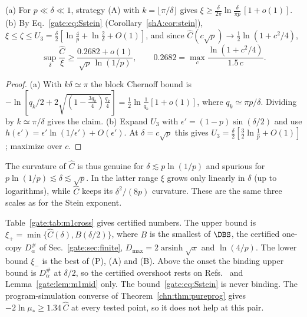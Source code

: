 \begin{proposition}\label{gate:prop:m1finite}
(a) For $p\ll\delta\ll1$, strategy (A) with $k=\lfloor\pi/\delta\rfloor$ gives $\xi\ge\frac{\delta}{2\pi}\ln\frac{\delta}{\pi p}\,[1+o(1)]$.
(b) By Eq.~\eqref{gate:eq:Sstein} (Corollary~\ref{shA:cor:stein}), $\xi\le\zeta\le U_3=\frac\delta2[\ln\frac4p+\ln\frac2\delta+O(1)]$, and since $\hat C(c\sqrt p)\to\frac12\ln(1+c^2/4)$,
\begin{equation}
\sup_\delta\frac{\hat C}{\xi}\ge\frac{0.2682+o(1)}{\sqrt p\,\ln(1/p)},\qquad 0.2682=\max_c\frac{\ln(1+c^2/4)}{1.5\,c}.
\end{equation}
\end{proposition}

\begin{proof}
(a) With $k\delta\simeq\pi$ the block Chernoff bound is $-\ln[q_k/2+2\sqrt{(1-\tfrac{3q_k}{4})\tfrac{q_k}{4}}]=\frac12\ln\frac1{q_k}[1+o(1)]$, where $q_k\simeq\pi p/\delta$. Dividing by $k\simeq\pi/\delta$ gives the claim.
(b) Expand $U_3$ with $\epsilon'=(1-p)\sin(\delta/2)$ and use $h(\epsilon')=\epsilon'\ln(1/\epsilon')+O(\epsilon')$. At $\delta=c\sqrt p$ this gives $U_3=\frac\delta2[\frac32\ln\frac1p+O(1)]$; maximize over $c$.
\end{proof}

The curvature of $\hat C$ is thus genuine for $\delta\lesssim p\ln(1/p)$ and spurious for $p\ln(1/p)\lesssim\delta\lesssim\sqrt p$. In the latter range $\xi$ grows only linearly in $\delta$ (up to logarithms), while $\hat C$ keeps its $\delta^2/(8p)$ curvature. These are the same three scales as for the Stein exponent.

Table~\ref{gate:tab:m1cross} gives certified numbers. The upper bound is $\xi_+=\min\{\hat C(\delta),B(\delta/2)\}$, where $B$ is the smallest of $\DBS$, the certified one-copy $D^\#_\alpha$ of Sec.~\ref{gate:sec:finite}, $D_{\max}=2\operatorname{arsinh}\sqrt{x}$ and $\ln(4/p)$. The lower bound $\xi_-$ is the best of (P), (A) and (B). Above the onset the binding upper bound is $D^\#_\alpha$ at $\delta/2$, so the certified overshoot rests on Refs.~\cite{FangFawzi2021,FawziFawzi2021} and Lemma~\ref{gate:lem:m1mid} only. The bound~\eqref{gate:eq:Sstein} is never binding. The program-simulation converse of Theorem~\ref{chn:thm:pureprog} gives $-2\ln\mu_*\ge1.34\,\hat C$ at every tested point, so it does not help at this pair.

